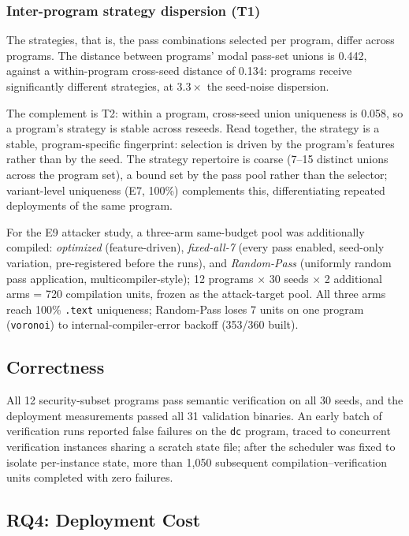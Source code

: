 \documentclass[pdflatex,sn-mathphys-num]{sn-jnl}
\theoremstyle{thmstyleone}%
\theoremstyle{thmstyletwo}%
\theoremstyle{thmstylethree}%
\begin{document}
\subsubsection{Inter-program strategy dispersion (T1)}
The strategies, that is, the pass combinations selected per program, differ
across programs. The distance between programs' modal pass-set unions is 0.442,
against a within-program cross-seed distance of 0.134: programs receive
significantly different strategies, at $3.3\times$ the seed-noise dispersion.

The complement is T2: within a program, cross-seed union uniqueness is 0.058, so a
program's strategy is stable across reseeds. Read together, the strategy is a stable,
program-specific fingerprint: selection is driven by the program's features rather
than by the seed. The strategy repertoire is coarse (7--15 distinct unions across
the program set), a bound set by the pass pool rather than the selector; variant-level
uniqueness (E7, 100\%) complements this, differentiating repeated deployments of the
same program.

For the E9 attacker study, a three-arm same-budget pool was additionally compiled:
\emph{optimized} (feature-driven), \emph{fixed-all-7} (every pass enabled, seed-only
variation, pre-registered before the runs), and \emph{Random-Pass} (uniformly random
pass application, multicompiler-style); 12 programs $\times$ 30 seeds $\times$ 2
additional arms = 720 compilation units, frozen as the attack-target pool. All three
arms reach 100\% \texttt{.text} uniqueness; Random-Pass loses 7 units on one program
(\texttt{voronoi}) to internal-compiler-error backoff (353/360 built).

\subsection{Correctness}
\label{sec:correctness}

All 12 security-subset programs pass semantic verification on all 30 seeds, and
the deployment measurements passed all 31 validation binaries. An early batch of
verification runs reported false failures on the \texttt{dc} program, traced to
concurrent verification instances sharing a scratch state file; after the
scheduler was fixed to isolate per-instance state, more than 1{,}050 subsequent
compilation--verification units completed with zero failures.

\subsection{RQ4: Deployment Cost}
\end{document}
